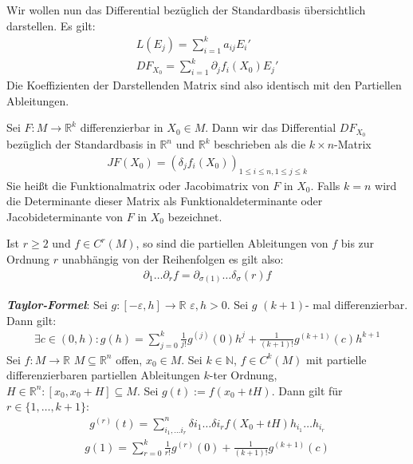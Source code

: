 \documentclass{report}
\renewcommand\epsilon{\varepsilon}
\newcommand*{\newpar}{\par\vspace{\baselineskip}\noindent}
\newcommand{\tbf}[1]{\textbf{#1}}
\newcommand{\bN}{\mathbb{N}}
\newcommand{\bR}{\mathbb{R}}
\begin{document}
 Wir wollen nun das Differential bezüglich der Standardbasis übersichtlich darstellen. Es gilt:
 \begin{align*}
  L(E_j) = \sum_{i=1}^k a_{ij} E_i'\\
  DF_{X_0} = \sum_{i=1}^k \partial_j f_i(X_0) E_j'
 \end{align*}
 Die Koeffizienten der Darstellenden Matrix sind also identisch mit den Partiellen Ableitungen.
\begin{theorem}
 Sei $F : M \to \bR^k$ differenzierbar in $X_0 \in M$. Dann wir das Differential $DF_{X_0}$ bezüglich der Standardbasis in $\bR^n$ und $\bR^k$ beschrieben als die $k \times n$-Matrix
 \begin{align*}
  JF(X_0) = (\delta_j f_i(X_0))_{1 \leq i \leq n, 1 \leq j \leq k}
 \end{align*}
 Sie heißt die Funktionalmatrix oder Jacobimatrix von $F$ in $X_0$. Falls $k = n$ wird die Determinante dieser Matrix als Funktionaldeterminante oder Jacobideterminante von $F$ in $X_0$ bezeichnet.
\end{theorem}
\newpar
[missing stuff]
\newpar
\begin{theorem}
 Ist $r \geq 2$ und $f \in C^r(M)$, so sind die partiellen Ableitungen von $f$ bis zur Ordnung $r$ unabhängig von der Reihenfolgen es gilt also:
 \begin{align*}
  \partial_1 \hdots \partial_r f = \partial_{\sigma(1)} \hdots \delta_\sigma(r) f
 \end{align*}
\end{theorem}
\begin{theorem}
 \emph{\tbf{Taylor-Formel}}: Sei $g: [-\epsilon, h] \to \bR$ $\epsilon, h > 0$.
 Sei $g$ $(k+1)$- mal differenzierbar. Dann gilt:
 \begin{align*}
  \exists c \in (0,h) : g(h) = \sum_{j = 0}^k \frac{1}{j!} g^{(j)} (0) h^j + \frac{1}{(k+1)!} g^{(k+1)}(c) h^{k+1}
 \end{align*}
 Sei $f : M \to \bR$ $M \subseteq \bR^n$ offen, $x_0 \in M$. Sei $k \in \bN$, $f \in C^k(M)$ mit partielle differenzierbaren partiellen Ableitungen $k$-ter Ordnung, $H \in \bR^n : [x_0, x_0+H] \subseteq M$. Sei $g(t) := f(x_0 + tH)$. Dann gilt für $r \in \{1, \hdots, k+1\}$:
 \begin{align*}
  g^{(r)}(t) = \sum_{i_1, \hdots i_r}^n \delta{i_1} \hdots \delta{i_r} f(X_0 + tH) h_{i_1} \hdots h_{i_r}
 \end{align*}
 \begin{align*}
  g(1) = \sum_{r=0}^k \frac{1}{r!} g^{(r)}(0) + \frac{1}{(k+1)!} g^{(k+1)}(c)
 \end{align*}
\end{theorem}
\end{document}
